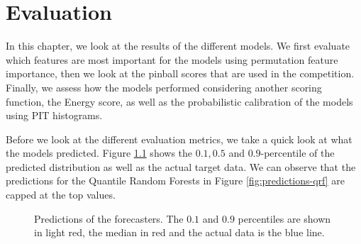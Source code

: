 \chapter{Evaluation}
\label{ch:evaluation}

In this chapter, we look at the results of the different models. 
We first evaluate which features are most important for the models using 
permutation feature importance, then we look at the pinball scores 
that are used in the competition. Finally, we assess how the models performed 
considering another scoring function, the Energy score, as well as the probabilistic calibration 
of the models using PIT histograms.

Before we look at the different evaluation metrics, 
we take a quick look at what the models predicted. 
Figure \ref{fig:predictions} shows the \(0.1, 0.5\) and \(0.9\)-percentile 
of the predicted distribution as well as the actual target data.
We can observe that the predictions for the Quantile Random Forests in Figure \ref{fig:predictions-qrf} are 
capped at the top values. 

\begin{figure}[h]%
    \centering
    \caption[Predictions]{Predictions of the forecasters. The \(0.1\) and \(0.9\) percentiles are shown in light red, the median in red and the actual data is the blue line.}%
    \label{fig:predictions}%
\end{figure}







